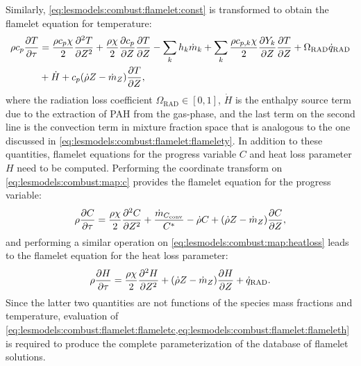 Similarly, \cref{eq:lesmodels:combust:flamelet:const} is transformed to obtain the flamelet equation for temperature:
\begin{equation}\label{eq:lesmodels:combust:flamelet:flamelett}
  \begin{split}
    \rho c_p \pder[T]{\tau} &= \frac{\rho c_p \chi}{2}\sder[T]{Z} + \frac{\rho\chi}{2}\pder[c_p]{Z}\pder[T]{Z} - \sum\limits_{k} h_k\dot{m}_k + \sum\limits_{k} \frac{\rho c_{p,k}\chi}{2}\pder[Y_k]{Z}\pder[T]{Z} + \Omega_{\text{RAD}}\dot{q}_{\text{RAD}} \\
    &+ \dot{H} + c_p(\dot{\rho}Z - \dot{m}_Z)\pder[T]{Z},
  \end{split}
\end{equation}
where the radiation loss coefficient $\Omega_{\text{RAD}} \in [0,1]$, $\dot{H}$ is the enthalpy source term due to the extraction of PAH from the gas-phase, and the last term on the second line is the convection term in mixture fraction space that is analogous to the one discussed in \cref{eq:lesmodels:combust:flamelet:flamelety}. In addition to these quantities, flamelet equations for the progress variable $C$ and heat loss parameter $H$ need to be computed. Performing the coordinate transform on \cref{eq:lesmodels:combust:map:c} provides the flamelet equation for the progress variable:
\begin{equation}\label{eq:lesmodels:combust:flamelet:flameletc}
  \rho\pder[C]{\tau} = \frac{\rho\chi}{2}\sder[C]{Z} + \frac{\dot{m}_{C_{\text{conv}}}}{C^*} - \dot{\rho}C + (\dot{\rho}Z - \dot{m}_Z)\pder[C]{Z},
\end{equation}
and performing a similar operation on \cref{eq:lesmodels:combust:map:heatloss} leads to the flamelet equation for the heat loss parameter:
\begin{equation}\label{eq:lesmodels:combust:flamelet:flameleth}
  \rho\pder[H]{\tau} = \frac{\rho\chi}{2}\sder[H]{Z} + (\dot{\rho}Z - \dot{m}_Z)\pder[H]{Z} + \dot{q}_{\text{RAD}}.
\end{equation}
Since the latter two quantities are not functions of the species mass fractions and temperature, evaluation of \cref{eq:lesmodels:combust:flamelet:flameletc,eq:lesmodels:combust:flamelet:flameleth} is required to produce the complete parameterization of the database of flamelet solutions.

